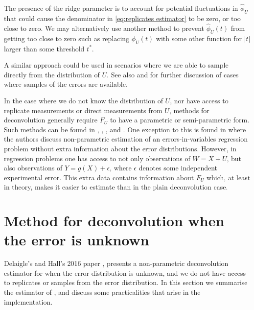 
	The presence of the ridge parameter is to account for potential fluctuations in $\hat{\phi}_U$ that could cause the denominator in \eqref{eq:replicates estimator} to be zero, or too close to zero. We may alternatively use another method to prevent $\hat{\phi}_U(t)$ from getting too close to zero such as replacing $\hat{\phi}_U(t)$ with some other function for $|t|$ larger than some threshold $t^*$.

	A similar approach could be used in scenarios where we are able to sample directly from the distribution of $U$. See also \cite{Diggle1993-jy} and \cite{Neumann1997-cr} for further discussion of cases where samples of the errors are available.

	In the case where we do not know the distribution of $U$, nor have access to replicate measurements or direct measurements from $U$, methods for deconvolution generally require $F_U$ to have a parametric or semi-parametric form. Such methods can be found in \cite{Butucea2005-be}, \cite{Meister2006-nu}, \cite{Butucea2008-wm}, and \cite{Kneip2012-aa}. One exception to this is found in \cite{Schennach2013-yv} where the authors discuss non-parametric estimation of an errors-in-variables regression problem without extra information about the error distributions. However, in regression problems one has access to not only observations of $W = X+ U$, but also observations of $Y = g(X) + \epsilon$, where $\epsilon$ denotes some independent experimental error. This extra data contains information about $F_U$ which, at least in theory, makes it easier to estimate than in the plain deconvolution case.
 
\section{Method for deconvolution when the error is unknown}
\label{sec:summary of delaigle hall}
	Delaigle's and Hall's 2016 paper \cite{Delaigle2016-la}, presents a non-parametric deconvolution estimator for when the error distribution is unknown, and we do not have access to replicates or samples from the error distribution. %
	In this section we summarise the estimator of \cite{Delaigle2016-la}, and discuss some practicalities that arise in the implementation. 

